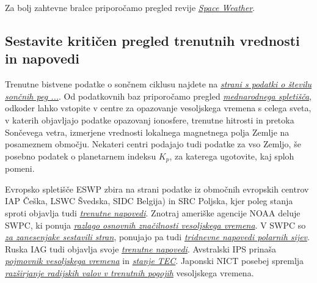 
 
Za bolj zahtevne bralce priporočamo pregled revije \href{http://agupubs.onlinelibrary.wiley.com/agu/journal/10.1002/(ISSN)1542-7390/}{\textit{Space Weather}}.

\subsection{Sestavite kritičen pregled trenutnih vrednosti in napovedi}
\label{subsec:VesVrem_Podat}
Trenutne bistvene podatke o sončnem ciklusu najdete na \href{http://www.swpc.noaa.gov/SolarCycle/}{\textit{strani s podatki o številu sončnih peg ...}}. Od podatkovnih baz priporočamo pregled  \href{http://www.spaceweather.org/}{\textit{mednarodnega spletišča}}, odkoder lahko vstopite v centre za opazovanje vesoljskega vremena s celega sveta, v katerih objavljajo podatke opazovanj ionosfere, trenutne hitrosti in pretoka Sončevega vetra, izmerjene vrednosti lokalnega magnetnega polja Zemlje na posameznem območju. Nekateri centri podajajo tudi podatke za vso Zemljo, še posebno podatek o planetarnem indeksu $K_p$, za katerega ugotovite, kaj sploh pomeni.

Evropsko spletišče ESWP zbira na strani podatke iz območnih evropskih centrov IAP Češka, LSWC Švedska, SIDC Belgija) in SRC Poljska, kjer poleg stanja sproti objavlja tudi  \href{http://www.spaceweather.eu/sl/nowforecasting}{\textit{trenutne napovedi}}. Znotraj ameriške agencije NOAA deluje SWPC, ki ponuja \href{http://www.swpc.noaa.gov/sites/default/files/images/u33/primer_2010_new.pdf}{\textit{razlago osnovnih značilnosti vesoljskega vremena}}. V SWPC so  \href{http://www.swpc.noaa.gov/communities/space-weather-enthusiasts}{\textit{za zanesenjake sestavili stran}}, ponujajo pa tudi \href{http://www.swpc.noaa.gov/products/aurora-3-day-forecast}{\textit{tridnevne napovedi polarnih sijev}}. Ruska IAG tudi objavlja svoje \href{http://www.tesis.lebedev.ru/en/forecast_activity.html}{\textit{trenutne napovedi}}. Avstralski IPS prinaša  \href{www.ips.gov.au}{\textit{pojmovnik vesoljskega vremena}} in \href{http://www.ips.gov.au/Satellite/2/2}{\textit{stanje TEC}}. Japonski NICT posebej spremlja \href{http://wdc.nict.go.jp/IONO/index_E.html}{\textit{razširjanje radijskih valov v trenutnih pogojih}} vesoljskega vremena.


